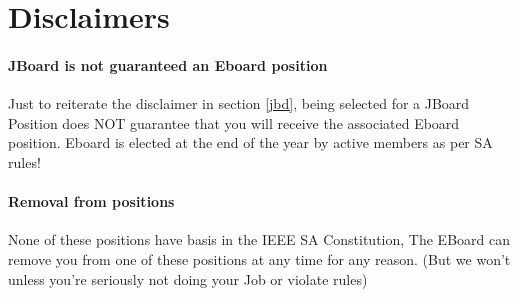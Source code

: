 \documentclass{article}
\begin{document}
\section{Disclaimers}
\paragraph{JBoard is not guaranteed an Eboard position}
Just to reiterate the disclaimer in section \ref{jbd}, being selected for a JBoard Position does NOT guarantee that you will receive the associated Eboard position. Eboard is elected at the end of the year by active members as per SA rules! 

\paragraph{Removal from positions}
None of these positions have basis in the IEEE SA Constitution, The EBoard can remove you from one of these positions at any time for any reason. (But we won't unless you're seriously not doing your Job or violate rules)
\end{document}
